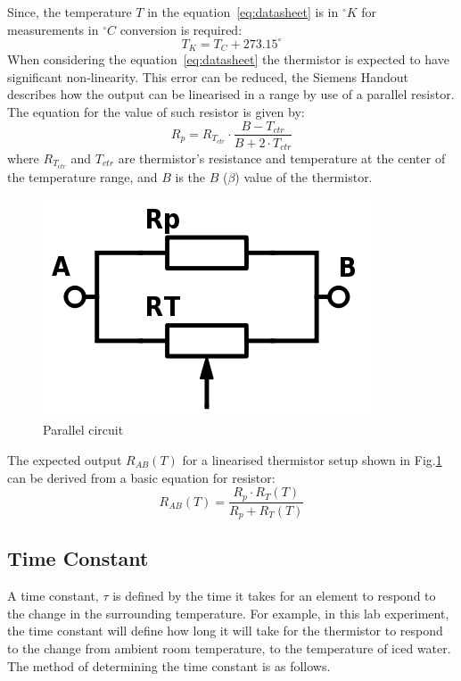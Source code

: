 \documentclass[a4,11pt]{article}
\begin{document}
Since, the temperature $T$ in the equation~\ref{eq:datasheet} is in $^\circ K$ for measurements in $^\circ C$ conversion is required:
\begin{equation}
\label{eq:ctok}
T_K=T_C+273.15^\circ
\end{equation}
When considering the equation~\ref{eq:datasheet} the thermistor is expected to have significant non-linearity. This error can be reduced, the Siemens Handout describes how the output can be linearised in a range by use of a parallel resistor. The equation for the value of such resistor is given by:
\begin{equation}
\label{eq:siemens}
R_p=R_{T_{ctr}}\cdot\frac{B-T_{ctr}}{B+2\cdot T_{ctr}}
\end{equation}
where $R_{T_{ctr}}$ and $T_{ctr}$ are thermistor's resistance and temperature at the center of the temperature range, and $B$ is the $B$ ($\beta$) value of the thermistor.
\begin{figure}[H]
	\label{fig:parallel}
	\centering
	\includegraphics[width=0.75\columnwidth]{parallel.png}
	\caption{
		Parallel circuit
	}
\end{figure}
The expected output $R_{AB}(T)$ for a linearised thermistor setup shown in Fig.\ref{fig:parallel} can be derived from a basic equation for resistor:
\begin{equation}
\label{eq:Rab}
R_{AB}(T)=\frac{R_p\cdot R_T(T)}{R_p+R_T(T)}
\end{equation}
\subsection{Time Constant} \label{sub:time}
A time constant, $\tau$ is defined by the time it takes for an element to respond to the change in the surrounding temperature. For example, in this lab experiment, the time constant will define how long it will take for the thermistor to respond to the change from ambient room temperature, to the temperature of iced water. The method of determining the time constant is as follows.
\end{document}
